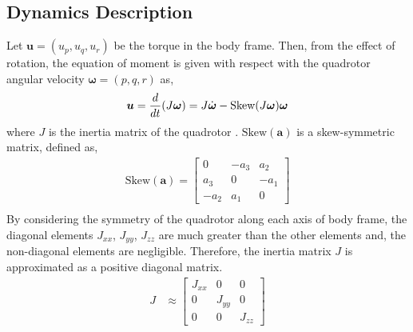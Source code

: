 \subsection{Dynamics Description}
Let \(\boldsymbol u = (u_p, u_q, u_r)\) be the torque in the body frame. Then, from the effect of rotation, the equation of moment is given with respect with the quadrotor angular velocity \({\boldsymbol \omega} = (p, q, r)\) as,\\
\begin{equation}
\label{eq:rotation}
\begin{aligned}
\boldsymbol{u} = {d \over dt}({J {\boldsymbol \omega}}) = J {\dot {\boldsymbol \omega}} -\text{Skew} (J {\boldsymbol \omega}) {\boldsymbol \omega}\\
\end{aligned}
\end{equation}
where \(J\) is the inertia matrix of the quadrotor \cite{Bolandi13}. \(\text{Skew} ({\boldsymbol a}) \) is a skew-symmetric matrix, defined as, \\
\begin{equation}
\begin{aligned}
\text{Skew} ({\boldsymbol a}) = 
\begin{bmatrix}
0 & - a_3 & a_2\\
a_3 & 0 & - a_1\\
-a_2 & a_1 & 0
\end{bmatrix}\\
\end{aligned}
\end{equation}
By considering the symmetry of the quadrotor along each axis of body frame, the diagonal elements \(J_{xx}\), \(J_{yy}\), \(J_{zz}\) are much greater than the other elements and, the non-diagonal elements are negligible. Therefore, the inertia matrix \(J\) is approximated as a positive diagonal matrix. \\
\begin{equation}
\begin{aligned}
J & \approx 
\begin{bmatrix}
J_{xx} & 0 & 0 \\
0 & J_{yy} & 0 \\
0 & 0 & J_{zz}
\end{bmatrix}
\end{aligned}
\end{equation}


